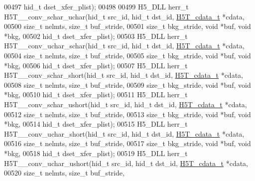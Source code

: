 \begin{DoxyCode}
00497                             hid\_t dset\_xfer\_plist);
00498 
00499 H5\_DLL herr\_t H5T\_\_conv\_schar\_uchar(hid\_t src\_id, hid\_t dst\_id, \hyperlink{struct_h5_t__cdata__t}{H5T\_cdata\_t} *cdata,
00500                             \textcolor{keywordtype}{size\_t} nelmts, \textcolor{keywordtype}{size\_t} buf\_stride,
00501                             \textcolor{keywordtype}{size\_t} bkg\_stride, \textcolor{keywordtype}{void} *buf, \textcolor{keywordtype}{void} *bkg,
00502                             hid\_t dset\_xfer\_plist);
00503 H5\_DLL herr\_t H5T\_\_conv\_uchar\_schar(hid\_t src\_id, hid\_t dst\_id, \hyperlink{struct_h5_t__cdata__t}{H5T\_cdata\_t} *cdata,
00504                             \textcolor{keywordtype}{size\_t} nelmts, \textcolor{keywordtype}{size\_t} buf\_stride,
00505                             \textcolor{keywordtype}{size\_t} bkg\_stride, \textcolor{keywordtype}{void} *buf, \textcolor{keywordtype}{void} *bkg,
00506                             hid\_t dset\_xfer\_plist);
00507 H5\_DLL herr\_t H5T\_\_conv\_schar\_short(hid\_t src\_id, hid\_t dst\_id, \hyperlink{struct_h5_t__cdata__t}{H5T\_cdata\_t} *cdata,
00508                             \textcolor{keywordtype}{size\_t} nelmts, \textcolor{keywordtype}{size\_t} buf\_stride,
00509                             \textcolor{keywordtype}{size\_t} bkg\_stride, \textcolor{keywordtype}{void} *buf, \textcolor{keywordtype}{void} *bkg,
00510                             hid\_t dset\_xfer\_plist);
00511 H5\_DLL herr\_t H5T\_\_conv\_schar\_ushort(hid\_t src\_id, hid\_t dst\_id, \hyperlink{struct_h5_t__cdata__t}{H5T\_cdata\_t} *cdata,
00512                             \textcolor{keywordtype}{size\_t} nelmts, \textcolor{keywordtype}{size\_t} buf\_stride,
00513                             \textcolor{keywordtype}{size\_t} bkg\_stride, \textcolor{keywordtype}{void} *buf, \textcolor{keywordtype}{void} *bkg,
00514                             hid\_t dset\_xfer\_plist);
00515 H5\_DLL herr\_t H5T\_\_conv\_uchar\_short(hid\_t src\_id, hid\_t dst\_id, \hyperlink{struct_h5_t__cdata__t}{H5T\_cdata\_t} *cdata,
00516                             \textcolor{keywordtype}{size\_t} nelmts, \textcolor{keywordtype}{size\_t} buf\_stride,
00517                             \textcolor{keywordtype}{size\_t} bkg\_stride, \textcolor{keywordtype}{void} *buf, \textcolor{keywordtype}{void} *bkg,
00518                             hid\_t dset\_xfer\_plist);
00519 H5\_DLL herr\_t H5T\_\_conv\_uchar\_ushort(hid\_t src\_id, hid\_t dst\_id, \hyperlink{struct_h5_t__cdata__t}{H5T\_cdata\_t} *cdata,
00520                             \textcolor{keywordtype}{size\_t} nelmts, \textcolor{keywordtype}{size\_t} buf\_stride,

\end{DoxyCode}
